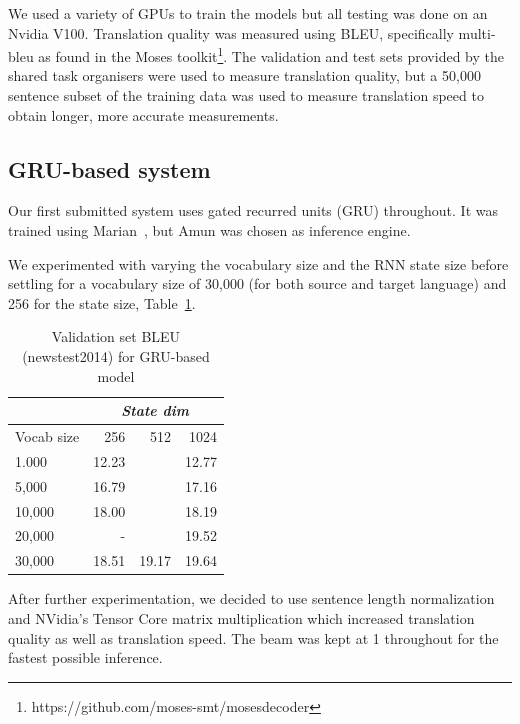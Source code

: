 \documentclass[11pt,a4paper]{article}
\begin{document}
We used a variety of GPUs to train the models but all testing was done on an Nvidia V100. Translation quality was measured using BLEU, specifically multi-bleu as found in the Moses toolkit\footnote{https://github.com/moses-smt/mosesdecoder}. The validation and test sets provided by the shared task organisers were used to measure translation quality, but a 50,000 sentence subset of the training data was used to measure translation speed to obtain longer, more accurate measurements.

\subsection{GRU-based system}


Our first submitted system uses gated recurred units (GRU) throughout. It was trained using Marian~\citep{junczys2018marian}, but Amun was chosen as inference engine.

We experimented with varying the vocabulary size and the RNN state size before settling for a vocabulary size of 30,000 (for both source and target language) and 256 for the state size, Table~\ref{tab:BLEU for newstest2014}.

\begin{table}
\begin{center}
\begin{tabular}{|l|r|r|r|} \hline
		& \multicolumn{3}{|c|}{\emph{State dim}}	\\ \hline	
Vocab size	& 256	& 512	& 1024 \\ \hline
1.000 		& 12.23 &	& 12.77 \\ 
5,000		& 16.79	&  	& 17.16 \\ 
10,000		& 18.00	& 	& 18.19 \\
20,000		& -	&	& 19.52 \\ 
30,000		& 18.51	& 19.17	& 19.64 \\ \hline
\end{tabular}
\end{center}
\caption{Validation set BLEU (newstest2014) for GRU-based model}
\label{tab:BLEU for newstest2014}
\end{table}

After further experimentation, we decided to use sentence length normalization and NVidia's Tensor Core matrix multiplication which increased translation quality as well as translation speed. The beam was kept at 1 throughout for the fastest possible inference.
\end{document}
